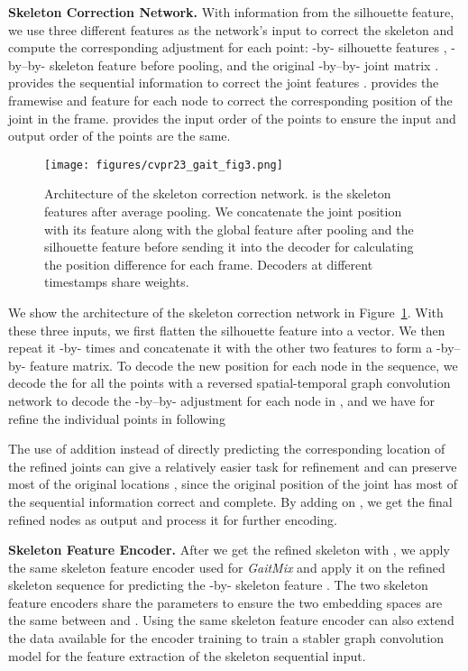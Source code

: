 \documentclass[10pt,twocolumn,letterpaper]{article}
\begin{document}
\textbf{Skeleton Correction Network.} With information from the silhouette feature, we use three different features as the network's input to correct the skeleton and compute the corresponding adjustment for each point: -by- silhouette features , -by--by- skeleton feature before pooling, and the original -by--by- joint matrix .  provides the sequential information to correct the joint features .  provides the framewise and feature for each node to correct the corresponding position of the joint in the frame.  provides the input order of the points to ensure the input and output order of the points are the same.





\begin{figure}[t]
    \centering
    \texttt{[image: figures/cvpr23\_gait\_fig3.png]}
    \caption{Architecture of the skeleton correction network.  is the skeleton features after average pooling. We concatenate the joint position  with its feature  along with the global feature after pooling  and the silhouette feature  before sending it into the decoder for calculating the position difference  for each frame. Decoders at different timestamps share weights.}
    \label{fig:correctnet}
\end{figure}

We show the architecture of the skeleton correction network in Figure~\ref{fig:correctnet}. With these three inputs, we first flatten the silhouette feature into a  vector. We then repeat it -by- times and concatenate it with the other two features to form a -by--by- feature matrix.
To decode the new position  for each node in the sequence, we decode the  for all the points with a reversed spatial-temporal graph convolution network to decode the -by--by- adjustment for each node in , and we have  for refine the individual points in  following

The use of addition instead of directly predicting the corresponding location of the refined joints can give a relatively easier task for refinement and can preserve most of the original locations \cite{zhu2022open}, since the original position of the joint has most of the sequential information correct and complete. By adding  on , we get the final refined nodes as output and process it for further encoding.


\textbf{Skeleton Feature Encoder.} After we get the refined skeleton  with , we apply the same skeleton feature encoder used for \textit{GaitMix} and apply it on the refined skeleton sequence  for predicting the -by- skeleton feature . The two skeleton feature encoders share the parameters to ensure the two embedding spaces are the same between  and . Using the same skeleton feature encoder can also extend the data available for the encoder training to train a stabler graph convolution model for the feature extraction of the skeleton sequential input.
\end{document}
